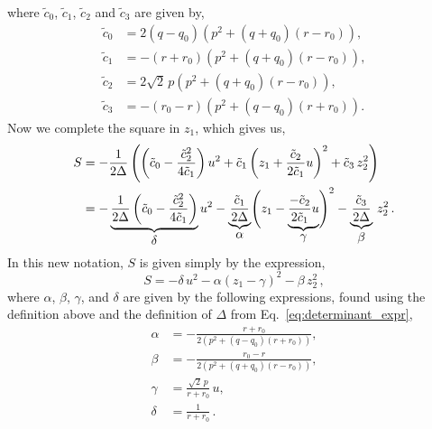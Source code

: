 \documentclass[journal]{IEEEtran}
\theoremstyle{plain}
\theoremstyle{definition}
\theoremstyle{remark}
\begin{document}
where $\tilde{c}_0$, $\tilde{c}_1$, $\tilde{c}_2$ and $\tilde{c}_3$ are given by,
\begin{equation}
\begin{split}
    \tilde{c}_0 &= 2 \left(q - q_0\right) \left(p^2 + \left(q + q_0\right) \left(r - r_0\right)\right), \\
    \tilde{c}_1 &= - \left(r+r_0\right) \left(p^2 + \left(q + q_0\right) \left(r - r_0\right)\right),\\
    \tilde{c}_2 &=  2\sqrt{2} \,p \left(p^2 + \left(q + q_0\right) \left(r - r_0\right)\right),\\
    \tilde{c}_3 &= - \left(r_0 - r\right) \left(p^2 + \left(q - q_0\right) \left(r + r_0\right)\right) .
\end{split}
\end{equation}
Now we complete the square in $z_1$, which gives us,
\begin{equation}
\begin{split}
S &= -\frac{1}{2\Delta} \left( \left(\tilde{c}_0 - \frac{\tilde{c}_2^2}{4\tilde{c}_1}\right) u^2 + \tilde{c}_1 \left(z_1 + \frac{\tilde{c}_2}{2\tilde{c}_1} u \right)^2  + \tilde{c}_3\,z_2^2 \right) \\
&= - \underbrace{\frac{1}{2\Delta} \left(\tilde{c}_0 - \frac{\tilde{c}_2^2}{4\tilde{c}_1}\right)}_{\text{\normalsize \(\delta\)}} u^2 - \underbrace{\frac{\tilde{c}_1}{2\Delta}}_{\text{\normalsize \(\alpha\)}}  \Biggl(z_1 -  \underbrace{\frac{-\tilde{c}_2}{2\tilde{c}_1} u}_{\text{\normalsize \(\gamma\)}} \Biggr)^2  -  \underbrace{\frac{\tilde{c}_3}{2\Delta}}_{\text{\normalsize \(\beta\)}} \,z_2^2 \,.
\end{split}
\end{equation}
In this new notation, $S$ is given simply by the expression,
\begin{equation}
    S = -\delta \, u^2 - \alpha \left(z_1 - \gamma \right)^2 - \beta \, z_2^2 \,,
\end{equation}
where $\alpha$, $\beta$, $\gamma$, and $\delta$ are given by the following expressions, found using the definition above and the definition of $\Delta$ from Eq.~\eqref{eq:determinant_expr},
\begin{equation}
\begin{aligned}
\alpha &=-\frac{r+r_0}{2\left(p^2+(q-q_0)(r+r_0)\right)},\\
\beta &= -\frac{r_0-r}{2\left(p^2+(q+q_0)(r-r_0)\right)},\\
\gamma &=\frac{\sqrt{2}\,p}{r+r_0}\,u,\\
\delta &= \frac{1}{r+r_0}\,.
\end{aligned}
\label{eq:defn_alpha_beta_gamma_delta}
\end{equation}
\end{document}
